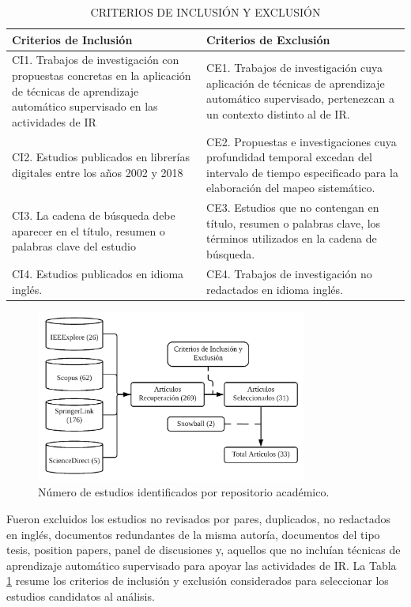 \documentclass[journal]{IEEEtran}
\begin{document}
\begin{table}[!t]
\renewcommand{\arraystretch}{1.3}
\caption{CRITERIOS DE INCLUSIÓN Y EXCLUSIÓN}
\label{tabla2}
\centering
\begin{tabular}{p{3.5cm}p{4cm}}
\hline
\hline
Criterios de Inclusión & Criterios de Exclusión \\
\hline
CI1. Trabajos de investigación con propuestas concretas en la aplicación de técnicas de aprendizaje automático supervisado en las actividades de IR  & CE1. Trabajos de investigación cuya aplicación de técnicas de aprendizaje automático supervisado, pertenezcan a un contexto distinto al de IR.\\ \cline{1-2}
CI2. Estudios publicados en librerías digitales entre los años 2002 y 2018 & CE2. Propuestas e investigaciones
cuya profundidad temporal excedan del intervalo de tiempo especificado para la elaboración del mapeo sistemático. \\ \cline{1-2}
CI3. La cadena de búsqueda debe aparecer en el título, resumen o palabras clave del estudio & CE3. Estudios que no contengan en título, resumen o palabras clave, los términos utilizados en la cadena de búsqueda. \\ \cline{1-2}
CI4. Estudios publicados en idioma inglés. & CE4. Trabajos de investigación no redactados en idioma inglés. \\
\hline \hline                                                                                                    
\end{tabular}
\end{table}

\begin{figure}[!t]
\centering
\includegraphics[width=3.5in]{figures/figure4_Guada.png}
\caption{Número de estudios identificados por repositorio acad\'emico.}
\label{fig:4}
\end{figure}

Fueron excluidos los estudios no revisados por pares, duplicados, no redactados en inglés, documentos redundantes de la misma autoría, documentos del tipo tesis, position papers, panel de discusiones y, aquellos que no incluían técnicas de aprendizaje automático supervisado para apoyar las actividades de IR. La Tabla \ref{tabla2} resume los criterios de inclusión y exclusión considerados para seleccionar los estudios candidatos al análisis.
\end{document}

